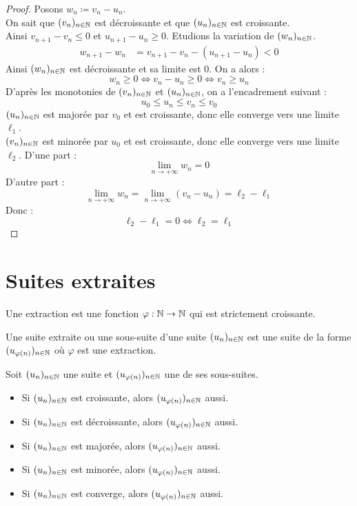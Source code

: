 \begin{proof}
    Posons $w_n \coloneqq v_n - u_n$.
    \\ 
    On sait que $(v_n)_{n \in \mathbb{N}}$ est décroissante et que $(u_n)_{n \in \mathbb{N}}$ est croissante. 
    \\ 
    Ainsi $v_{n+1} - v_n \leq 0$ et $u_{n+1} - u_n \geq 0$.
    Etudions la variation de $(w_n)_{n \in \mathbb{N}}$.
    \begin{align*}
        w_{n+1} - w_n &= v_{n+1} - v_n - (u_{n+1} - u_n) < 0
    \end{align*}
    Ainsi $(w_n)_{n \in \mathbb{N}}$ est décroissante et sa limite est $0$.
    On a alors  :
    \[ w_n \geq 0 \iff  v_n - u_n \geq 0 \iff v_n \geq u_n \]
    D'après les monotonies de $(v_n)_{n \in \mathbb{N}}$ et $(u_n)_{n \in \mathbb{N}}$, on a l'encadrement suivant : 
    \[ u_0 \leq u_n \leq v_n \leq v_0 \]
    $(u_n)_{n \in \mathbb{N}}$ est majorée par $v_0$ et est croissante, donc elle converge vers une limite $\ell_1$.
    \\ 
    $(v_n)_{n \in \mathbb{N}}$ est minorée par $u_0$ et est croissante, donc elle converge vers une limite $\ell_2$.
    D'une part :
    \[ \lim_{n \to +\infty} w_n = 0 \]
    D'autre part :
    \[ \lim_{n \to +\infty} w_n = \lim_{n \to +\infty} (v_n - u_n) = \ell_2 - \ell_1 \]
    Donc :
    \[ \ell_2 - \ell_1 = 0 \iff \ell_2 = \ell_1 \]
\end{proof}

\section{Suites extraites}
\begin{definition}[Extraction]
    Une extraction est une fonction $\varphi : \mathbb{N} \to \mathbb{N}$ qui est strictement croissante.
\end{definition}

\begin{definition}
    Une suite extraite ou une sous-suite d'une suite $(u_n)_{n \in \mathbb{N}}$ est une suite de la forme $(u_{\varphi(n)})_{n \in \mathbb{N}}$ où $\varphi$ est une extraction.
\end{definition}

\begin{proposition}
    Soit $(u_n)_{n \in \mathbb{N}}$ une suite et $(u_{\varphi(n)})_{n \in \mathbb{N}}$ une de ses sous-suites.
    \begin{itemize}
        \item Si $(u_n)_{n \in \mathbb{N}}$ est croissante, alors $(u_{\varphi(n)})_{n \in \mathbb{N}}$ aussi.
        \item Si $(u_n)_{n \in \mathbb{N}}$ est décroissante, alors $(u_{\varphi(n)})_{n \in \mathbb{N}}$ aussi.
        \item Si $(u_n)_{n \in \mathbb{N}}$ est majorée, alors $(u_{\varphi(n)})_{n \in \mathbb{N}}$ aussi.
        \item Si $(u_n)_{n \in \mathbb{N}}$ est minorée, alors $(u_{\varphi(n)})_{n \in \mathbb{N}}$ aussi.
        \item Si $(u_n)_{n \in \mathbb{N}}$ est converge, alors $(u_{\varphi(n)})_{n \in \mathbb{N}}$ aussi.
    \end{itemize}
\end{proposition}

